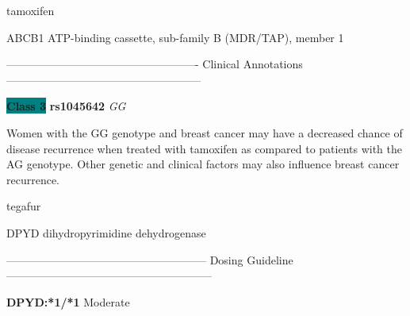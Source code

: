 \documentclass{resume} %
\begin{document}
\begin{rSection}{ tamoxifen }
\begin{rSubsection}{ ABCB1 }{ ATP-binding cassette, sub-family B (MDR/TAP), member 1 }{}{}
\item[]

\item[] ---------------------------------------------------- Clinical Annotations -----------------------------------------------------\newline
\item \textbf{\colorbox{teal} {Class 3}} \textbf{ rs1045642 } \textit{ GG }
\item[] Women with the GG genotype and breast cancer may have a decreased chance of disease recurrence when treated with tamoxifen as compared to patients with the AG genotype. Other genetic and clinical factors may also influence breast cancer recurrence.
\end{rSubsection}

\end{rSection}\begin{rSection}{ tegafur }
\item[]

\begin{rSubsection}{ DPYD }{ dihydropyrimidine dehydrogenase }{}{}
\item[]
\item[] ------------------------------------------------------ Dosing Guideline --------------------------------------------------------\newline
\item[] \textbf{ DPYD:*1/*1 } Moderate


\end{rSubsection}
\end{rSection}
\end{document}
